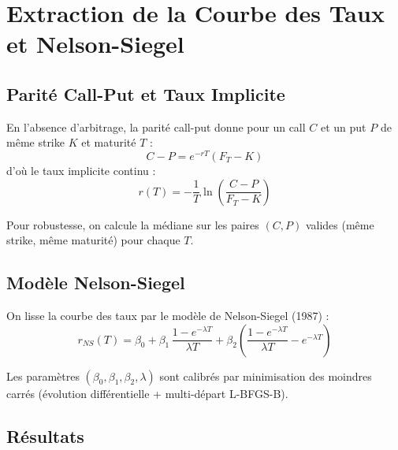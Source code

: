 \section{Extraction de la Courbe des Taux et Nelson-Siegel}
\label{sec:taux}

\subsection{Parité Call-Put et Taux Implicite}

En l'absence d'arbitrage, la parité call-put donne pour un call $C$ et un put $P$
de même strike $K$ et maturité $T$ :
\begin{equation}
  C - P = e^{-rT}(F_T - K)
  \label{eq:put_call_parity}
\end{equation}
d'où le taux implicite continu :
\begin{equation}
  r(T) = -\frac{1}{T}\ln\!\left(\frac{C - P}{F_T - K}\right)
  \label{eq:taux_implicite}
\end{equation}

Pour robustesse, on calcule la médiane sur les paires $(C, P)$ valides
(même strike, même maturité) pour chaque $T$.

\subsection{Modèle Nelson-Siegel}

On lisse la courbe des taux par le modèle de Nelson-Siegel (1987) :
\begin{equation}
  r_{NS}(T) = \beta_0 + \beta_1\,\frac{1 - e^{-\lambda T}}{\lambda T}
            + \beta_2\!\left(\frac{1 - e^{-\lambda T}}{\lambda T} - e^{-\lambda T}\right)
  \label{eq:nelson_siegel}
\end{equation}

Les paramètres $(\beta_0, \beta_1, \beta_2, \lambda)$ sont calibrés par
minimisation des moindres carrés (évolution différentielle + multi-départ L-BFGS-B).


\subsection{Résultats}


